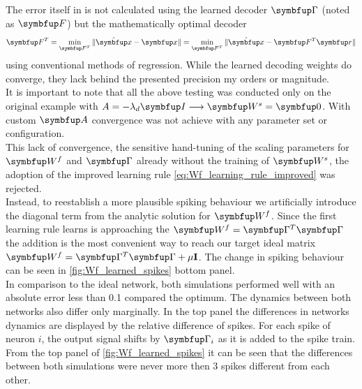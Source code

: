The error itself in \cite{brendel_learning_2020} is not calculated using the learned decoder $\bmu{\Gamma}$ (noted as $\bmu{F}$) but the mathematically optimal decoder
\begin{equation}
\bmu{F}^T = \min_{\bmu{F}^T} \|\hat{\bmu{x}} - \bmu{x}\| = \min_{\bmu{F}^T} \|\hat{\bmu{x}} - \bmu{F}^T\bmu{r}\|
\end{equation}
using conventional methods of regression. While the learned decoding weights do converge, they lack behind the presented precision my orders or magnitude.\\
It is important to note that all the above testing was conducted only on the original example with $A = -\lambda_d\bmu{I} \longrightarrow \bmu{W}^s = \bmu{0}$. With custom $\bmu{A}$ convergence was not achieve with any parameter set or configuration.\\
This lack of convergence, the sensitive hand-tuning of the scaling parameters for $\bmu{W}^f$ and $\bmu{\Gamma}$ already without the training of $\bmu{W}^s$, the adoption of the improved learning rule \cref{eq:Wf_learning_rule_improved} was rejected.\\
Instead, to reestablish a more plausible spiking behaviour we
artificially introduce the diagonal term from the analytic solution for $\bmu{W}^f$. Since the first learning rule learns is approaching the $\bmu{W}^f = \bmu{\Gamma}^T\bmu{\Gamma}$ the addition is the most convenient way to reach our target ideal matrix $\bmu{W}^f = \bmu{\Gamma}^T\bmu{\Gamma} + \mu\mathbf{I}$. The change in spiking behaviour can be seen in \cref{fig:Wf_learned_spikes} bottom panel.\\
In comparison to the ideal network, both simulations performed well with an absolute error less than 0.1 compared the optimum. The dynamics between both networks also differ only marginally. In the top panel the differences in networks dynamics are displayed by the relative difference of spikes. For each spike of neuron $i$, the output signal shifts by $\bmu{\Gamma}_i$ as it is added to the spike train. From the top panel of \cref{fig:Wf_learned_spikes} it can be seen that the differences between both simulations were never more then 3 spikes different from each other.

